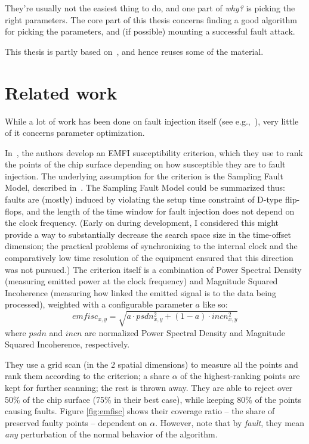 \documentclass[times, utf8, diplomski]{fer}
\begin{document}
They're usually not the easiest thing to do, and one part of \emph{why?} is
picking the right parameters. The core part of this thesis concerns finding
a good algorithm for picking the parameters, and (if possible) mounting a
successful fault attack.


This thesis is partly based on~\cite{paper_FDTC2018}, and hence reuses some
of the material.


\section{Related work}\label{sec:related_work}
While a lot of work has been done on fault injection itself (see
e.g.,~\cite{Kommerling, boneh_demillo_lipton, nsamwel_africacrypt, impeccable_circuits, FI_crowbars}),
very little of it concerns parameter optimization.

In~\cite{madau2017fault}, the authors develop an EMFI susceptibility criterion,
which they use to rank the points of the chip surface depending on how susceptible
they are to fault injection. The underlying assumption for the criterion is the
Sampling Fault Model, described in~\cite{ordas2015injection}. The Sampling Fault
Model could be summarized thus: faults are (mostly) induced by violating the
setup time constraint of D-type flip-flops, and the length of the time window
for fault injection does not depend on the clock frequency. (Early on during
development, I considered this might provide a way to substantially decrease
the search space size in the time-offset dimension; the practical problems of
synchronizing to the internal clock and the comparatively low time resolution
of the equipment ensured that this direction was not pursued.) The criterion
itself is a combination of Power Spectral Density (measuring emitted power at
the clock frequency) and Magnitude Squared Incoherence (measuring how linked
the emitted signal is to the data being processed), weighted with a configurable
parameter $a$ like so:
\[
    emfisc_{x,y} = \sqrt{a \cdot psdn_{x,y}^2   +   (1-a) \cdot incn_{x,y}^2}
\]
where $psdn$ and $incn$ are normalized Power Spectral Density and Magnitude
Squared Incoherence, respectively.


They use a grid scan (in the 2 spatial dimensions) to measure all the points
and rank them according to the criterion; a share $\alpha$ of the highest-ranking
points are kept for further scanning; the rest is thrown away.
They are able to reject over 50\% of the chip surface (75\% in their best case),
while keeping 80\% of the points causing faults. Figure \ref{fig:emfisc} shows
their coverage ratio -- the share of preserved faulty points -- dependent on $\alpha$.
However, note that by \emph{fault}, they mean \emph{any} perturbation of the
normal behavior of the algorithm.
\end{document}
